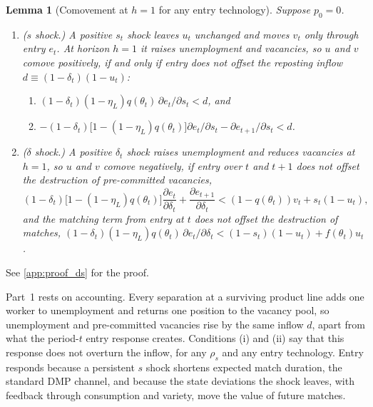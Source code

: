 \documentclass[authoryear, review, 12pt]{elsarticle}
\newtheorem{lemma}{Lemma}
\begin{document}
\begin{lemma}[Comovement at $h=1$ for any entry technology]\label{lem:accounting}
Suppose $p_0=0$.
\begin{enumerate}
	\item \emph{($s$ shock.)} A positive $s_t$ shock leaves $u_t$ unchanged and moves $v_t$
	only through entry $e_t$. At horizon $h=1$ it raises unemployment and vacancies, so
	$u$ and $v$ comove positively, if and only if entry does not offset the reposting
	inflow $d\equiv(1-\delta_t)(1-u_t)$:
	\begin{enumerate}
		\item[(i)] $(1-\delta_t)(1-\eta_L)q(\theta_t)\,\partial e_t/\partial s_t<d$, and
		\item[(ii)] $-(1-\delta_t)\bigl[1-(1-\eta_L)q(\theta_t)\bigr]
		\partial e_t/\partial s_t-\partial e_{t+1}/\partial s_t<d$.
	\end{enumerate}
	\item \emph{($\delta$ shock.)} A positive $\delta_t$ shock raises unemployment and
	reduces vacancies at $h=1$, so $u$ and $v$ comove negatively, if entry over $t$ and
	$t+1$ does not offset the destruction of pre-committed vacancies,
	\begin{equation*}
		(1-\delta_t)\bigl[1-(1-\eta_L)q(\theta_t)\bigr]
		\frac{\partial e_t}{\partial\delta_t}
		+\frac{\partial e_{t+1}}{\partial\delta_t}
		<(1-q(\theta_t))v_t+s_t(1-u_t),
	\end{equation*}
	and the matching term from entry at $t$ does not offset the destruction of matches,
	$(1-\delta_t)(1-\eta_L)q(\theta_t)\,\partial e_t/\partial\delta_t<(1-s_t)(1-u_t)+f(\theta_t)u_t$.
\end{enumerate}
\end{lemma}
\noindent See \ref{app:proof_ds} for the proof.

Part~1 rests on accounting. Every separation at a surviving product line adds one worker to
unemployment and returns one position to the vacancy pool, so unemployment and pre-committed
vacancies rise by the same inflow $d$, apart from what the period-$t$ entry response creates.
Conditions (i) and (ii) say that this response does not overturn the inflow, for any $\rho_s$
and any entry technology. Entry responds because a persistent $s$ shock shortens expected
match duration, the standard DMP channel, and because the state deviations the shock leaves,
with feedback through consumption and variety, move the value of future matches.
\end{document}
